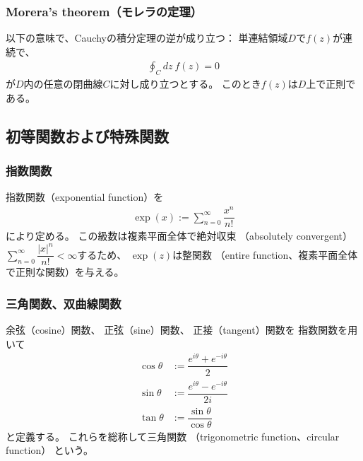 \subsubsection{Morera's theorem（モレラの定理）}

以下の意味で、Cauchyの積分定理の逆が成り立つ：
単連結領域$D$で$f(z)$が連続で、
\begin{align}
    \oint_C dz\ f(z) = 0
\end{align}
が$D$内の任意の閉曲線$C$に対し成り立つとする。
このとき$f(z)$は$D$上で正則である。

\newpage
\subsection{初等関数および特殊関数}

\subsubsection{指数関数}

指数関数（exponential function）を
\begin{align}
    \exp(x)
    :=
    \sum_{n=0}^\infty
    \dfrac{x^n}{n!}
\end{align}
により定める。
この級数は複素平面全体で絶対収束
（absolutely convergent）
$\displaystyle
\sum_{n=0}^\infty
\dfrac{|x|^n}{n!}
< \infty
$するため、
$\exp(z)$は整関数
（entire function、複素平面全体で正則な関数）を与える。

\subsubsection{三角関数、双曲線関数}

余弦（cosine）関数、
正弦（sine）関数、
正接（tangent）関数を
指数関数を用いて
\begin{subequations}
\begin{align}
    \cos\theta &:= \dfrac{e^{i\theta} + e^{-i\theta}}{2}
\\
    \sin\theta &:= \dfrac{e^{i\theta} - e^{-i\theta}}{2i}
\\
    \tan\theta &:= \dfrac{\sin\theta}{\cos\theta}
\end{align}
\end{subequations}
と定義する。
これらを総称して三角関数
（trigonometric function、circular function）
という。

